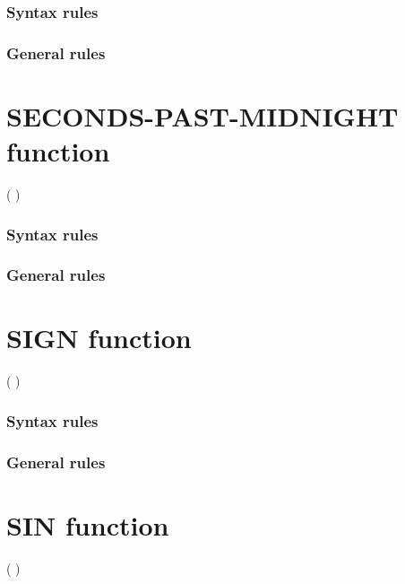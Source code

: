 \subsubsection{Syntax rules}

\subsubsection{General rules}

\section{SECONDS-PAST-MIDNIGHT function}

\begin{syntax}
    ( \argument )
\end{syntax}

\subsubsection{Syntax rules}

\subsubsection{General rules}

\section{SIGN function}

\begin{syntax}
    ( \argument )
\end{syntax}

\subsubsection{Syntax rules}

\subsubsection{General rules}

\section{SIN function}

\begin{syntax}
    ( \argument )
\end{syntax}

